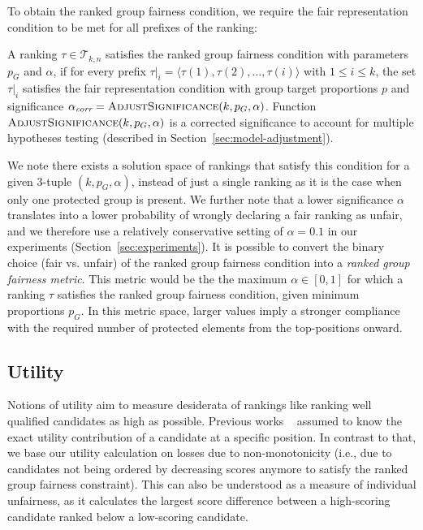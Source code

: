 To obtain the ranked group fairness condition, we require the fair representation condition to be met for all prefixes of the ranking:

\begin{definition}
	\label{def:ranked-group-fairness-condition}
	A ranking $\tau \in {\mathcal T}_{k,n}$ satisfies the ranked group fairness condition with parameters $p_G$ and $\alpha$, if for every prefix $\tau|_i = \langle \tau(1), \tau(2), \dots, \tau(i) \rangle$ with $1 \le i \le k$, the set $\tau|_i$ satisfies the fair representation condition with group target proportions $p$ and significance $\alpha_\textit{corr} = \text{{\sc AdjustSignificance}}(k, p_G, \alpha)$.
	Function $\text{{\sc AdjustSignificance}}(k, p_G, \alpha)$ is a corrected significance to account for multiple hypotheses testing (described in Section~\ref{sec:model-adjustment}).
\end{definition}

We note there exists a solution space of rankings that satisfy this condition for a given 3-tuple $(k, p_G, \alpha)$, instead of just a single ranking as it is the case when only one protected group is present.
%
We further note that a lower significance $\alpha$ translates into a lower probability of wrongly declaring a fair ranking as unfair, and we therefore use a relatively conservative setting of $\alpha=0.1$ in our experiments (Section~\ref{sec:experiments}).
%
It is possible to convert the binary choice (fair vs. unfair) of the ranked group fairness condition into a \emph{ranked group fairness metric}. This metric would be the the maximum $\alpha \in [0,1]$ for which a ranking $\tau$ satisfies the ranked group fairness condition, given minimum proportions $p_G$.
%
In this metric space, larger values imply a stronger compliance with the required number of protected elements from the top-positions onward.

\subsection{Utility}
\label{subsec:individual-fairness}
Notions of utility aim to measure desiderata of rankings like ranking well qualified candidates as high as possible.
%
Previous works ~\cite{yang2016measuring,celis2017ranking} assumed to know the exact utility contribution of a candidate at a specific position. In contrast to that, we base our utility calculation on losses due to non-monotonicity (i.e., due to candidates not being ordered by decreasing scores anymore to satisfy the ranked group fairness constraint).
%
This can also be understood as a measure of individual unfairness, as it calculates the largest score difference between a high-scoring candidate ranked below a low-scoring candidate.

